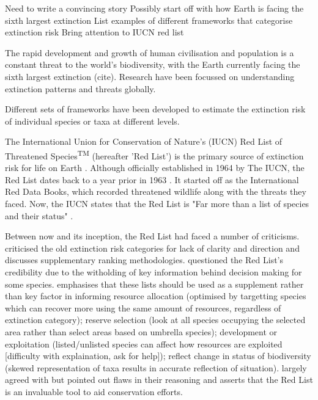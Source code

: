 Need to write a convincing story
Possibly start off with how Earth is facing the sixth largest extinction
List examples of different frameworks that categorise extinction risk
Bring attention to IUCN red list

The rapid development and growth of human civilisation and population is a constant threat to the world's biodiversity, with the Earth currently facing the sixth largest extinction (cite).
Research have been focussed on understanding extinction patterns and threats globally. 

Different sets of frameworks have been developed to estimate the extinction risk of individual species or taxa at different levels.


The International Union for Conservation of Nature's (IUCN) Red List of Threatened Species\textsuperscript{TM} (hereafter 'Red List') is the primary source of extinction risk for life on Earth \parencite{iucn2021, rodrigues2006value, lamoreux2003value}. Although officially established in 1964 by The IUCN, the Red List dates back to a year prior in 1963 \parencite{scott1987red}. It started off as the International Red Data Books, which recorded threatened wildlife along with the threats they faced. Now, the IUCN states that the Red List is "Far more than a list of species and their status" \parencite{iucn2021}. 

Between now and its inception, the Red List had faced a number of criticisms. \textcite{master1991assessing} criticised the old extinction risk categories for lack of clarity and direction and discusses supplementary ranking methodologies. \textcite{mrosovsky1997iucn} questioned the Red List's credibility due to the witholding of key information behind decision making for some species. \textcite{possingham2002limits} emphasises that these lists should be used as a supplement rather than key factor in informing resource allocation (optimised by targetting species which can recover more using the same amount of resources, regardless of extinction category); reserve selection (look at all species occupying the selected area rather than select areas based on umbrella species); development or exploitation (listed/unlisted species can affect how resources are exploited [difficulty with explaination, ask for help]); reflect change in status of biodiversity (skewed representation of taxa results in accurate reflection of situation). \textcite{lamoreux2003value} largely agreed with \textcite*{possingham2002limits} but pointed out flaws in their reasoning and asserts that the Red List is an invaluable tool to aid conservation efforts. 

